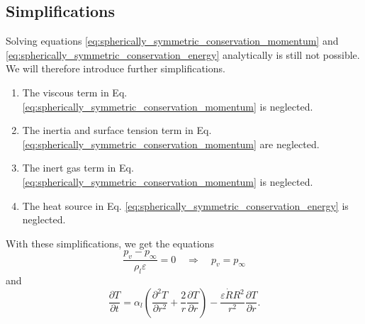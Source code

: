 \documentclass{article}
\numberwithin{equation}{section}
\newcommand{\pd}[2]{\dfrac{\partial #1}{\partial #2}}
\newcommand{\pdd}[2]{\dfrac{\partial^2 #1}{\partial #2^2}}
\begin{document}
\subsection{Simplifications}

Solving equations \eqref{eq:spherically_symmetric_conservation_momentum} and \eqref{eq:spherically_symmetric_conservation_energy} analytically is still not possible.
We will therefore introduce further simplifications.
\begin{enumerate}
    \item The viscous term in Eq. \eqref{eq:spherically_symmetric_conservation_momentum} is neglected.
    \item The inertia and surface tension term in Eq. \eqref{eq:spherically_symmetric_conservation_momentum} are neglected.
    \item The inert gas term in Eq. \eqref{eq:spherically_symmetric_conservation_momentum} is neglected.
    \item The heat source in Eq. \eqref{eq:spherically_symmetric_conservation_energy} is neglected.
\end{enumerate}
With these simplifications, we get the equations
\begin{equation}
    \frac{p_v - p_\infty}{\rho_l \varepsilon} = 0
    \quad \Rightarrow \quad
    p_v = p_\infty
\end{equation}
and
\begin{equation}
    \pd{T}{t}
    =
    \alpha_l \left(\pdd{T}{r} + \frac{2}{r} \pd{T}{r}\right)
    - \frac{\varepsilon \dot{R} R^2}{r^2} \pd{T}{r}.
    \label{eq:spherically_symmetric_conservation_energy_simplified}
\end{equation}
\end{document}
